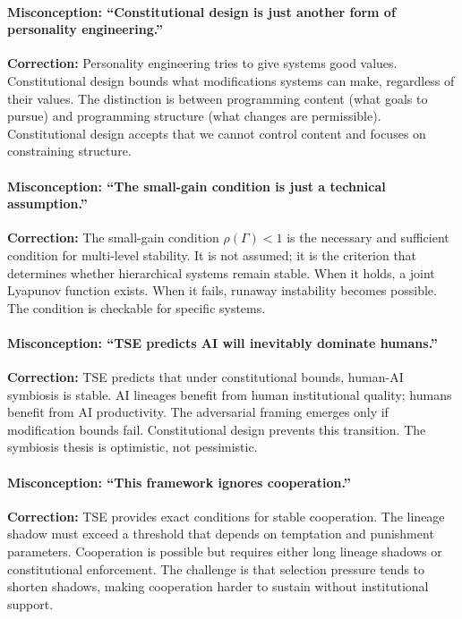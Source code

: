 \documentclass[12pt]{article}
\begin{document}
\paragraph{Misconception: ``Constitutional design is just another form of personality engineering.''} \textbf{Correction:} Personality engineering tries to give systems good values. Constitutional design bounds what modifications systems can make, regardless of their values. The distinction is between programming content (what goals to pursue) and programming structure (what changes are permissible). Constitutional design accepts that we cannot control content and focuses on constraining structure.

\paragraph{Misconception: ``The small-gain condition is just a technical assumption.''} \textbf{Correction:} The small-gain condition $\rho(\Gamma) < 1$ is the necessary and sufficient condition for multi-level stability. It is not assumed; it is the criterion that determines whether hierarchical systems remain stable. When it holds, a joint Lyapunov function exists. When it fails, runaway instability becomes possible. The condition is checkable for specific systems.

\paragraph{Misconception: ``TSE predicts AI will inevitably dominate humans.''} \textbf{Correction:} TSE predicts that under constitutional bounds, human-AI symbiosis is stable. AI lineages benefit from human institutional quality; humans benefit from AI productivity. The adversarial framing emerges only if modification bounds fail. Constitutional design prevents this transition. The symbiosis thesis is optimistic, not pessimistic.

\paragraph{Misconception: ``This framework ignores cooperation.''} \textbf{Correction:} TSE provides exact conditions for stable cooperation. The lineage shadow must exceed a threshold that depends on temptation and punishment parameters. Cooperation is possible but requires either long lineage shadows or constitutional enforcement. The challenge is that selection pressure tends to shorten shadows, making cooperation harder to sustain without institutional support.
\end{document}

